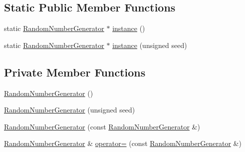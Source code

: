 \subsection*{Static Public Member Functions}
\begin{DoxyCompactItemize}
\item 
static \mbox{\hyperlink{class_random_number_generator}{Random\+Number\+Generator}} $\ast$ \mbox{\hyperlink{class_random_number_generator_ab20e4f6dae4e1d216357d26675488e45}{instance}} ()
\item 
static \mbox{\hyperlink{class_random_number_generator}{Random\+Number\+Generator}} $\ast$ \mbox{\hyperlink{class_random_number_generator_acb83c75147d9d2bff7b3e3f45239ecb1}{instance}} (unsigned seed)
\end{DoxyCompactItemize}
\subsection*{Private Member Functions}
\begin{DoxyCompactItemize}
\item 
\mbox{\hyperlink{class_random_number_generator_a8e7e711ea58f13f3ed95becbe33684e9}{Random\+Number\+Generator}} ()
\item 
\mbox{\hyperlink{class_random_number_generator_acef4ebf02f3377b707787aa1f69aff1d}{Random\+Number\+Generator}} (unsigned seed)
\item 
\mbox{\hyperlink{class_random_number_generator_a0007ec836f6bb43c27e2082264189c4c}{Random\+Number\+Generator}} (const \mbox{\hyperlink{class_random_number_generator}{Random\+Number\+Generator}} \&)
\item 
\mbox{\hyperlink{class_random_number_generator}{Random\+Number\+Generator}} \& \mbox{\hyperlink{class_random_number_generator_a5986c38214e8c774239eee89c768f172}{operator=}} (const \mbox{\hyperlink{class_random_number_generator}{Random\+Number\+Generator}} \&)
\end{DoxyCompactItemize}
